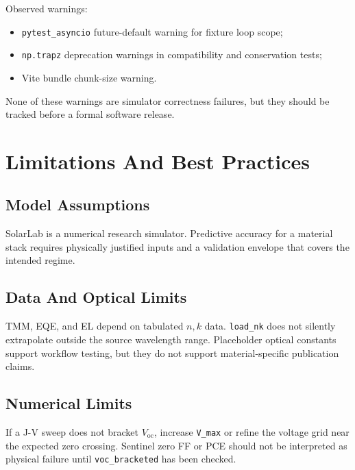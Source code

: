 \documentclass[
  11pt,
  american,
]{report}
\providecommand{\tightlist}{%
  \setlength{\itemsep}{0pt}\setlength{\parskip}{0pt}}
\begin{document}
Observed warnings:

\begin{itemize}
\tightlist
\item
  \texttt{pytest\_asyncio} future-default warning for fixture loop
  scope;
\item
  \texttt{np.trapz} deprecation warnings in compatibility and
  conservation tests;
\item
  Vite bundle chunk-size warning.
\end{itemize}

None of these warnings are simulator correctness failures, but they
should be tracked before a formal software release.

\hypertarget{limitations-and-best-practices}{%
\chapter{Limitations And Best
Practices}\label{limitations-and-best-practices}}

\hypertarget{model-assumptions}{%
\section{Model Assumptions}\label{model-assumptions}}

SolarLab is a numerical research simulator. Predictive accuracy for a
material stack requires physically justified inputs and a validation
envelope that covers the intended regime.

\hypertarget{data-and-optical-limits}{%
\section{Data And Optical Limits}\label{data-and-optical-limits}}

TMM, EQE, and EL depend on tabulated \(n,k\) data. \texttt{load\_nk}
does not silently extrapolate outside the source wavelength range.
Placeholder optical constants support workflow testing, but they do not
support material-specific publication claims.

\hypertarget{numerical-limits}{%
\section{Numerical Limits}\label{numerical-limits}}

If a J-V sweep does not bracket \(V_\mathrm{oc}\), increase
\texttt{V\_max} or refine the voltage grid near the expected zero
crossing. Sentinel zero FF or PCE should not be interpreted as physical
failure until \texttt{voc\_bracketed} has been checked.
\end{document}
